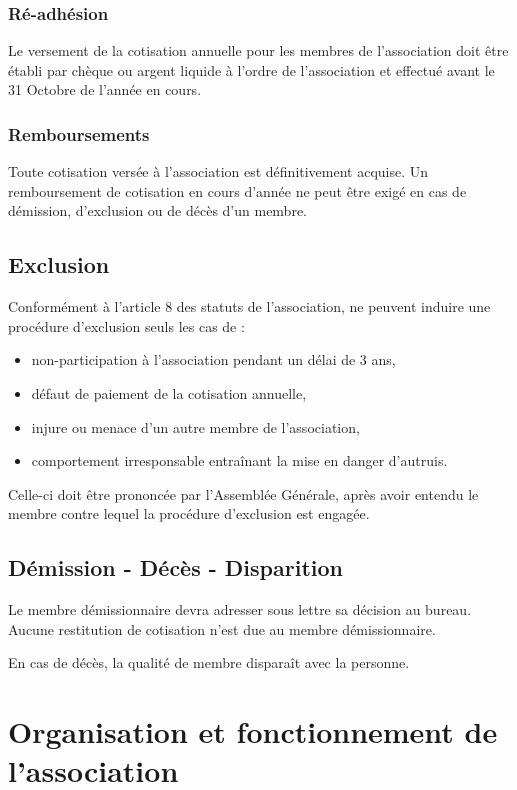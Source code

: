 \documentclass[a4paper,french,10pt]{article}
\begin{document}
\subsubsection*{Ré-adhésion}

Le versement de la cotisation annuelle pour les membres de l'association doit être établi par chèque ou argent liquide à l'ordre de l'association et effectué avant le 31 Octobre de l'année en cours.

\subsubsection*{Remboursements}

Toute cotisation versée à l'association est définitivement acquise. Un remboursement de cotisation en cours d'année ne peut être exigé en cas de démission, d'exclusion ou de décès d'un membre.

\subsection{Exclusion}
Conformément à l'article 8 des statuts de l'association, ne peuvent induire une procédure d'exclusion seuls les cas de :
\begin{itemize}
\item non-participation à l'association pendant un délai de 3 ans,
\item défaut de paiement de la cotisation annuelle,
\item injure ou menace d'un autre membre de l'association,
\item comportement irresponsable entraînant la mise en danger d'autruis.
\end{itemize}

Celle-ci doit être prononcée par l'Assemblée Générale, après avoir entendu le membre contre lequel la procédure d'exclusion est engagée.

\subsection{Démission - Décès - Disparition}
Le membre démissionnaire devra adresser sous lettre sa décision au bureau.
Aucune restitution de cotisation n'est due au membre démissionnaire.

En cas de décès, la qualité de membre disparaît avec la personne.

\section{Organisation et fonctionnement de l'association}
\end{document}
